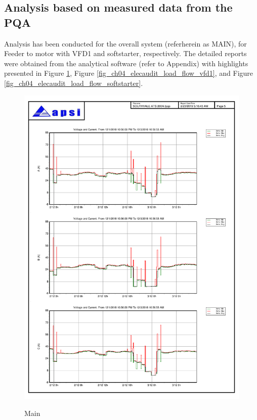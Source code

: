 \subsection{Analysis based on measured data from the PQA}
Analysis has been conducted for the overall system (referherein as MAIN), for Feeder to motor with VFD1 and softstarter, respectively. The detailed reports were obtained from the analytical software (refer to Appendix) with highlights presented in Figure \ref{fig_ch04_elecaudit_load_flow_main}, Figure \ref{fig_ch04_elecaudit_load_flow_vfd1}, and Figure \ref{fig_ch04_elecaudit_load_flow_softstarter}.

\begin{figure}
	\includegraphics[width=\textwidth]{figures/fig_ch04_elecaudit_load_flow_main.pdf} \\
	\caption{Main}
	\label{fig_ch04_elecaudit_load_flow_main} 
\end{figure}

